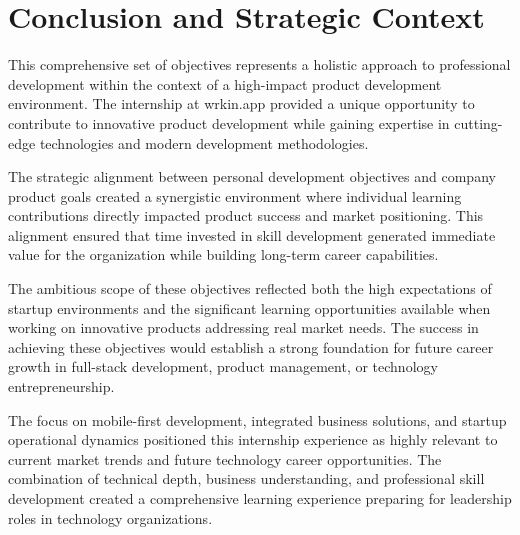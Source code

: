 \section{Conclusion and Strategic Context}

This comprehensive set of objectives represents a holistic approach to professional development within the context of a high-impact product development environment. The internship at wrkin.app provided a unique opportunity to contribute to innovative product development while gaining expertise in cutting-edge technologies and modern development methodologies.

The strategic alignment between personal development objectives and company product goals created a synergistic environment where individual learning contributions directly impacted product success and market positioning. This alignment ensured that time invested in skill development generated immediate value for the organization while building long-term career capabilities.

The ambitious scope of these objectives reflected both the high expectations of startup environments and the significant learning opportunities available when working on innovative products addressing real market needs. The success in achieving these objectives would establish a strong foundation for future career growth in full-stack development, product management, or technology entrepreneurship.

The focus on mobile-first development, integrated business solutions, and startup operational dynamics positioned this internship experience as highly relevant to current market trends and future technology career opportunities. The combination of technical depth, business understanding, and professional skill development created a comprehensive learning experience preparing for leadership roles in technology organizations.
